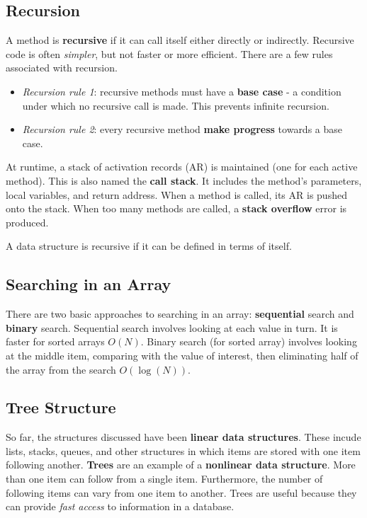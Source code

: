 \subsection{Recursion}

A method is \textbf{recursive} if it can call itself either directly or indirectly. Recursive code is often \textit{simpler}, but not faster or more efficient. There are a few rules associated with recursion. 

\begin{itemize}
	\item \textit{Recursion rule 1}: recursive methods must have a \textbf{base case} - a condition under which no recursive call is made. This prevents infinite recursion. 
	\item \textit{Recursion rule 2}: every recursive method \textbf{make progress} towards a base case. 
\end{itemize}

At runtime, a stack of activation records (AR) is maintained (one for each active method). This is also named the \textbf{call stack}. It includes the method's parameters, local variables, and return address. When a method is called, its AR is pushed onto the stack. When too many methods are called, a \textbf{stack overflow} error is produced. 

A data structure is recursive if it can be defined in terms of itself. 

\subsection{Searching in an Array}

There are two basic approaches to searching in an array: \textbf{sequential} search and \textbf{binary} search. Sequential search involves looking at each value in turn. It is faster for sorted arrays $O(N)$. Binary search (for sorted array) involves looking at the middle item, comparing with the value of interest, then eliminating half of the array from the search $O(\log(N))$. 

\subsection{Tree Structure}

So far, the structures discussed have been \textbf{linear data structures}. These incude lists, stacks, queues, and other structures in which items are stored with one item following another. \textbf{Trees} are an example of a \textbf{nonlinear data structure}. More than one item can follow from a single item. Furthermore, the number of following items can vary from one item to another. Trees are useful because they can provide \textit{fast access} to information in a database. 

